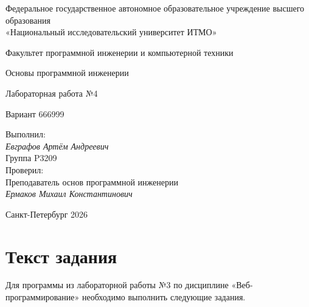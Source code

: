 \documentclass[a4paper,14pt]{extarticle}
\begin{document}
\begin{titlepage}
    \thispagestyle{empty}
    \begin{center}
        {\color{gray!45}\small
        Федеральное государственное автономное образовательное учреждение высшего образования\\
        «Национальный исследовательский университет ИТМО»\par}

        \vspace{0.9cm}
        Факультет программной инженерии и компьютерной техники

        \vspace{0.9cm}
        Основы программной инженерии

        \vfill
        {\Large Лабораторная работа №4\par}
        \vspace{0.7cm}
        {\large Вариант 666999\par}
    \end{center}

    \vfill
    \begin{flushright}
        Выполнил:\\[5mm]
        \textit{Евграфов Артём Андреевич}\\[5mm]
        Группа P3209\\[7mm]
        Проверил:\\[5mm]
        Преподаватель основ программной инженерии\\[3mm]
        \textit{Ермаков Михаил Константинович}
    \end{flushright}

    \vfill
    \begin{center}
        {\color{gray!45}Санкт-Петербург 2026}
    \end{center}
\end{titlepage}

\tableofcontents
\newpage

\section*{Текст задания}

Для программы из лабораторной работы №3 по дисциплине «Веб-программирование» необходимо выполнить следующие задания.
\end{document}
